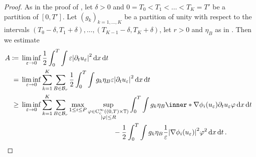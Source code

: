 \begin{proof}
	As in the proof of , let $ \delta > 0 $ 
	and $ 0 = T_{ 0 } < T_{ 1 } < \dotsc < T_{ K } = T' $ be a partition of $ [ 
	0 , T' ] $. Let $ ( g_{ k } )_{ k = 1 , \dotsc , K } $ be a partition of 
	unity with respect to the intervals $ ( T_{ 0 } - \delta , T_{ 1 } + \delta 
	), \dotsc , ( T_{ K - 1 } - \delta , T_{ K } + \delta ) $, let $ r > 0 $
	and $ \eta_{ B } $ as in 
	. Then we estimate
	\begin{align*}
		 A \coloneqq{}& \liminf_{ \varepsilon \to 0 }
			\frac{ 1 }{ 2 }
			\int_{ 0 }^{ T }
				\int
					\varepsilon
					\abs{ \partial_{ t } u_{ \varepsilon } }^{ 2 }
				\dd{ x }
			\dd{ t }
		\\
		={} &
		\liminf_{ \varepsilon \to 0 }
			\sum_{ k = 1 }^{ K }
				\sum_{ B \in \mathcal{ B }_{ r } } 
					\frac{ 1 }{ 2 }
					\int_{ 0 }^{ T }
						\int
							g_{ k } \eta_{ B }
							\varepsilon
							\abs{ \partial_{ t } u_{ \varepsilon } }^{ 2 }
						\dd{ x }
					\dd{ t }
		\\
		\geq{} &
		\liminf_{ \varepsilon \to 0 }
			\sum_{ k = 1 }^{ K }
				\sum_{ B \in \mathcal{ B }_{ r } }
					\max_{ 1 \leq i \leq P }
						\sup_{ 
							\substack{ 
								\varphi \in \cont_{ \mathrm{c} }^{ \infty } 
								\left( ( 0 , T ) \times \flattorus \right)
								\\
								\abs{ \varphi } \leq R  
							}
						}
							\int_{ 0 }^{ T }
								\int
									g_{ k } \eta_{ B }
									\inner*{ \nabla \phi_{ i } ( u_{ 
									\varepsilon 
									} ) }{ \partial_{ t } u_{ \varepsilon } }
									\varphi
								\dd{ x }
							\dd{ t } 
		\\
							& \qquad \qquad \qquad \qquad \qquad \qquad \quad 
							\:\, -
							\frac{ 1 }{ 2 }
							\int_{ 0 }^{ T }
								\int
									g_{ k } \eta_{ B }
									\frac{ 1 }{ \varepsilon }
									\abs{ \nabla \phi_{ i } ( u_{ \varepsilon } 
									) }^{ 2 }
									\varphi^{ 2 }
								\dd{ x }
							\dd{ t }.
	\end{align*}
	\begin{comment}
	\geq{} &
	\liminf_{ \varepsilon \to 0 }
	\sum_{ k = 1 }^{ K }
	\sum_{ B \in \mathcal{ B }_{ r } }
	\max_{ 1 \leq i \leq P }
	\sup_{ 
		\substack{ 
			\varphi \in \cont_{ \mathrm{c} }^{ \infty } 
			\left( ( 0 , T ) \times \flattorus \right)
			\\
			\abs{ \varphi } \leq R  
		}
	}
	\int_{ 0 }^{ T }
	\int
	g_{ k } \eta_{ B }
	\partial_{ t } \psi_{ \varepsilon , i }
	\varphi
	\dd{ x }

\end{comment}
\end{proof}

